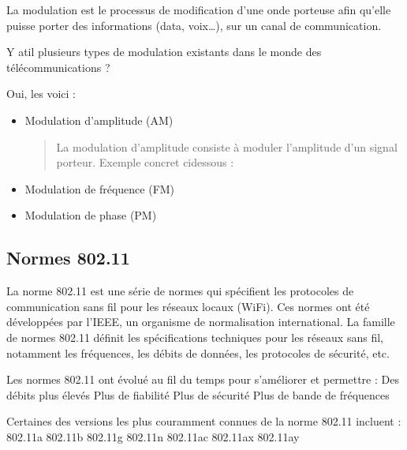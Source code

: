 \documentclass[letterpaper,10pt,french]{sphinxmanual}
\begin{document}
\sphinxAtStartPar
La modulation est le processus de modification d’une onde porteuse afin qu’elle puisse porter des informations (data, voix…), sur un canal de communication.

\sphinxAtStartPar
Y a\sphinxhyphen{}t\sphinxhyphen{}il plusieurs types de modulation existants dans le monde des télécommunications ?

\sphinxAtStartPar
Oui, les voici :
\begin{itemize}
\item {} 
\sphinxAtStartPar
Modulation d’amplitude (AM)
\begin{quote}

\sphinxAtStartPar
La modulation d’amplitude consiste à moduler l’amplitude d’un signal porteur.
Exemple concret ci\sphinxhyphen{}dessous :

\end{quote}

\item {} 
\sphinxAtStartPar
Modulation de fréquence (FM)

\item {} 
\sphinxAtStartPar
Modulation de phase (PM)

\end{itemize}


\subsection{Normes 802.11}
\label{\detokenize{Documentation-M144:normes-802-11}}
\sphinxAtStartPar
La norme 802.11 est une série de normes qui spécifient les protocoles de communication sans fil pour les réseaux locaux (Wi\sphinxhyphen{}Fi). Ces normes ont été développées par l’IEEE, un organisme de normalisation international. La famille de normes 802.11 définit les spécifications techniques pour les réseaux sans fil, notamment les fréquences, les débits de données, les protocoles de sécurité, etc.

\sphinxAtStartPar
Les normes 802.11 ont évolué au fil du temps pour s’améliorer et permettre :
\sphinxhyphen{} Des débits plus élevés
\sphinxhyphen{} Plus de fiabilité
\sphinxhyphen{} Plus de sécurité
\sphinxhyphen{} Plus de bande de fréquences

\sphinxAtStartPar
Certaines des versions les plus couramment connues de la norme 802.11 incluent :
\sphinxhyphen{} 802.11a
\sphinxhyphen{} 802.11b
\sphinxhyphen{} 802.11g
\sphinxhyphen{} 802.11n
\sphinxhyphen{} 802.11ac
\sphinxhyphen{} 802.11ax
\sphinxhyphen{} 802.11ay
\end{document}
